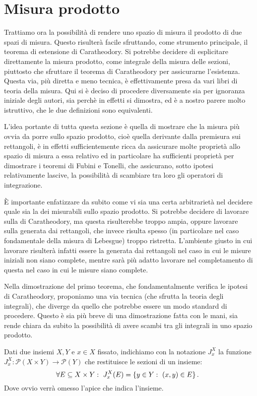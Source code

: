 \section{Misura prodotto}
Trattiamo ora la possibilità di rendere uno spazio di misura il prodotto di due spazi di misura. 
Questo risulterà facile sfruttando, come strumento principale, il teorema di estensione di Caratheodory. 
Si potrebbe decidere di esplicitare direttamente la misura prodotto, come integrale della misura delle sezioni, piuttosto che sfruttare il teorema di Caratheodory per assicurarne l'esistenza. 
Questa via, più diretta e meno tecnica, è effettivamente presa da vari libri di teoria della misura. Qui si è deciso di procedere diversamente sia per ignoranza iniziale degli autori, sia perchè in effetti si dimostra, ed è a nostro parere molto istruttivo, che le due definizioni sono equivalenti.

L'idea portante di tutta questa sezione è quella di mostrare che la misura più ovvia da porre sullo spazio prodotto, cioè quella derivante dalla premisura sui rettangoli, è in effetti sufficientemente  ricca da assicurare molte proprietà allo spazio di misura a essa relativo ed in particolare ha sufficienti proprietà per dimostrare i teoremi di Fubini e Tonelli, che assicurano, sotto ipotesi relativamente lascive, la possibilità di scambiare tra loro gli operatori di integrazione.

È importante enfatizzare da subito come vi sia una certa arbitrarietà nel decidere quale sia la \sigalg{} dei misurabili sullo spazio prodotto. Si potrebbe decidere di lavorare sulla \sigalg{} di Caratheodory, ma questa risulterebbe troppo ampia, oppure lavorare sulla \sigalg{} generata dai rettangoli, che invece risulta spesso (in particolare nel caso fondamentale della misura di Lebesgue) troppo ristretta.
L'ambiente giusto in cui lavorare risulterà infatti essere la \sigalg{} generata dai rettangoli nel caso in cui le misure iniziali non siano complete, mentre sarà più adatto lavorare nel completamento di questa \sigalg{} nel caso in cui le misure siano complete.



Nella dimostrazione del primo teorema, che fondamentalmente verifica le ipotesi di Caratheodory, proponiamo una via tecnica (che sfrutta la teoria degli integrali), che diverge da quello che potrebbe essere un modo standard di procedere. Questo è sia più breve di una dimostrazione fatta con le mani, sia rende chiara da subito la possibilità di avere scambi tra gli integrali in uno spazio prodotto. 
\newcommand{\B}{\ensuremath{\mathscr B}}
\begin{definition}\label{def:SezioneProdotto}
	Dati due insiemi $X,Y$ e $x\in X$ fissato, indichiamo con la notazione $J^X_x$ la funzione $J^X_x:\mathcal P(X\times Y) \to \mathcal P(Y)$ che restituisce le sezioni di un insieme:
	\begin{equation*}
		\forall E\subseteq X\times Y:\ J^X_x(E)=\{y\in Y:\ (x,y)\in E\}\, \text{. }
	\end{equation*}
	Dove ovvio verrà omesso l'apice che indica l'insieme.
\end{definition}

